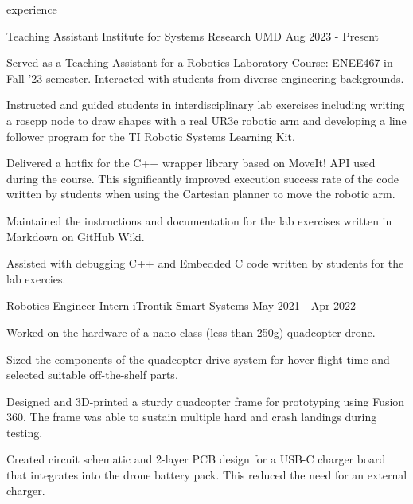\begin{section}{experience}

  \begin{work}
    {Teaching Assistant}
    {Institute for Systems Research}
    {UMD}
    {Aug 2023 - Present}

    \item Served as a Teaching Assistant for a Robotics Laboratory Course:
          ENEE467 in Fall '23 semester. Interacted with students from
          diverse engineering backgrounds.

    \item Instructed and guided students in interdisciplinary lab exercises
          including writing a roscpp node to draw shapes with a real UR3e
          robotic arm and developing a line follower program for the TI Robotic
          Systems Learning Kit.

    \item Delivered a hotfix for the C++ wrapper library based on MoveIt!
          API used during the course. This significantly improved execution
          success rate of the code written by students when using the Cartesian
          planner to move the robotic arm.

    \item Maintained the instructions and documentation for the lab exercises
          written in Markdown on GitHub Wiki.

    \item Assisted with debugging C++ and Embedded C code written by students
          for the lab exercies.


  
  \end{work}

  \begin{work}
    {Robotics Engineer Intern}
    {iTrontik Smart Systems}
    {}
    {May 2021 - Apr 2022}

    \item Worked on the hardware of a nano class (less than 250g) quadcopter drone.
    \item Sized the components of the quadcopter drive system for hover flight time and selected suitable off-the-shelf parts. 
    \item Designed and 3D-printed a sturdy quadcopter frame for prototyping using Fusion 360. 
          The frame was able to sustain multiple hard and crash landings during testing.
    \item Created circuit schematic and 2-layer PCB design for a USB-C charger board that integrates into
          the drone battery pack. This reduced the need for an external charger.
  
  \end{work}

\end{section}